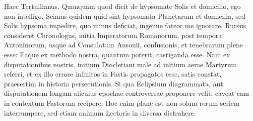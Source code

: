 Haec Tertullianus.
Quanquam quod dicit de hypsomate Solis
et domicilio, ego non intelligo.
Scimus quidem quid sint hypsomata
Planetarum et domicilia, sed Solis hypsoma impedire, quo minus
deficiat, ingenue fateor me ignorare.
Rursus consideret Chronologus,
initia Imperatorum Romanorum, post tempora Antoninorum,
usque ad Consulatum Ausonii, confusionis, et tenebrarum plene esse:
Eaque ex methodo nostra, quantum poterit, castiganda esse.
Nam ex disputationibus
nostris, initium Diocletiani male ad initium aerae Martyrum
referri, et ex illo errore infinitos in Fastis propagatos esse, satis
constat, praesertim in historia persecutionis.
Si qua Eclipsium diagrammata,
aut disputationem longam alicuius epochae controversae proponere
velit, caveat eam in contextum Fastorum recipere.
{}
Hoc enim
plane est non solum rerum seriem interrumpere, sed etiam animum
Lectoris in diversa distrahere.

